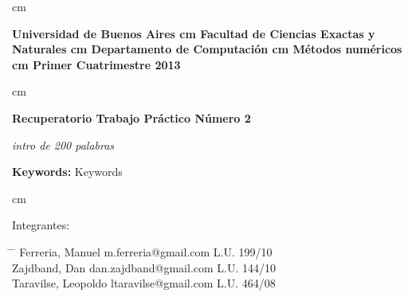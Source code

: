  cm
\begin{flushright}
\huge\bf Universidad de Buenos Aires
 cm
\Large\bf Facultad de Ciencias Exactas y Naturales
 cm
\Large\bf Departamento de Computaci\'on
 cm
\Large\bf  M\'etodos num\'ericos
 cm
\Large\bf Primer Cuatrimestre 2013
\end{flushright}

 cm
\begin{center}
\LARGE\bf Recuperatorio Trabajo Pr\'actico N\'umero 2

\vskip 1.0cm
\normalsize \emph{intro de 200 palabras}

\vskip 1.0cm
\large {\bf Keywords:} Keywords

\end{center}



 cm
\begin{flushleft}
\large Integrantes:
\begin{tabbing}
\hspace{5cm} \= \hspace{5.5cm} \= \hspace{3cm} \kill
Ferreria, Manuel \> m.ferreria@gmail.com \> L.U. 199/10  \\
Zajdband, Dan \> dan.zajdband@gmail.com \> L.U. 144/10 \\
Taravilse, Leopoldo \> ltaravilse@gmail.com \> L.U. 464/08\\
\end{tabbing}
\end{flushleft}
